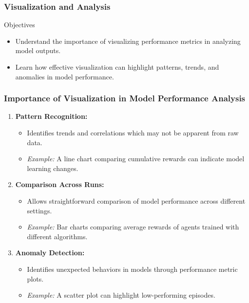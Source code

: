 \documentclass{beamer}
\begin{document}
\begin{frame}[fragile]
    \frametitle{Visualization and Analysis}
    \begin{block}{Objectives}
        \begin{itemize}
            \item Understand the importance of visualizing performance metrics in analyzing model outputs.
            \item Learn how effective visualization can highlight patterns, trends, and anomalies in model performance.
        \end{itemize}
    \end{block}
\end{frame}

\begin{frame}[fragile]
    \frametitle{Importance of Visualization in Model Performance Analysis}
    \begin{enumerate}
        \item \textbf{Pattern Recognition:}
        \begin{itemize}
            \item Identifies trends and correlations which may not be apparent from raw data.
            \item \textit{Example:} A line chart comparing cumulative rewards can indicate model learning changes.
        \end{itemize}
        
        \item \textbf{Comparison Across Runs:}
        \begin{itemize}
            \item Allows straightforward comparison of model performance across different settings.
            \item \textit{Example:} Bar charts comparing average rewards of agents trained with different algorithms.
        \end{itemize}

        \item \textbf{Anomaly Detection:}
        \begin{itemize}
            \item Identifies unexpected behaviors in models through performance metric plots.
            \item \textit{Example:} A scatter plot can highlight low-performing episodes.
        \end{itemize}
    \end{enumerate}
\end{frame}
\end{document}
